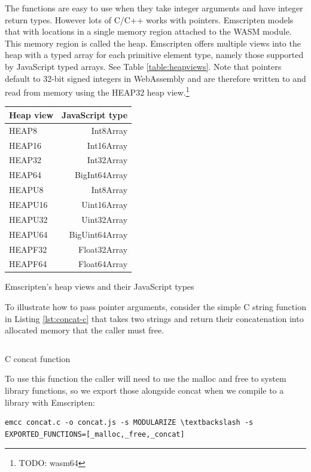 \documentclass[11pt]{book}
\begin{document}
The functions are easy to use when they take integer arguments and have integer return types. However lots of C/C++ works with pointers. Emscripten models that with locations in a single memory region attached to the WASM module. This memory region is called the heap. Emscripten offers multiple views into the heap with a typed array for each primitive element type, namely those supported by JavaScript typed arrays. See Table \ref{table:heapviews}.
Note that pointers default to 32-bit signed integers in WebAssembly and are therefore written to and read from memory using the HEAP32 heap view.\footnote{TODO: wasm64}

\begin{listing}[H] 
\begin{table}[H]
\centering
\begin{tabular}{|l|r|}
\hline
\textbf{Heap view} & \textbf{JavaScript type} \\ \hline
HEAP8 & Int8Array \\ \hline
HEAP16 & Int16Array \\ \hline
HEAP32 & Int32Array \\ \hline
HEAP64 & BigInt64Array \\ \hline
HEAPU8 & Int8Array \\ \hline
HEAPU16 & Uint16Array \\ \hline
HEAPU32 & Uint32Array \\ \hline
HEAPU64 & BigUint64Array \\ \hline
HEAPF32 & Float32Array \\ \hline
HEAPF64 & Float64Array \\ \hline
\end{tabular}
\end{table}
\caption{Emscripten's heap views and their JavaScript types}
\label{table:heapviews}
\end{listing}

To illustrate how to pass pointer arguments, consider the simple C string function in Listing \ref{lst:concat-c} that takes two strings and return their concatenation into allocated memory that the caller must free.

\begin{listing}[H] 
\inputminted[fontsize=\small,baselinestretch=0.5,linenos]{C}{code/examples/emcc/concat.c}
\caption{C concat function }
\label{lst:concat-c}    
\end{listing} 

To use this function the caller will need to use the malloc and free to system library functions, so we export those alongside concat when we compile to a library with Emscripten:
\begin{verbatim}
emcc concat.c -o concat.js -s MODULARIZE \textbackslash -s EXPORTED_FUNCTIONS=[_malloc,_free,_concat]
\end{verbatim}
\end{document}
